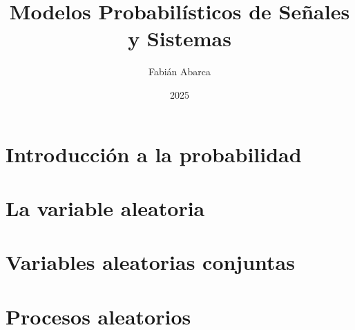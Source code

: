 \documentclass{memoir}
\title{Modelos Probabilísticos de Señales y Sistemas}
\author{Fabián Abarca}
\date{2025}
\begin{document}
\maketitle
\newpage
\tableofcontents

\part{Introducción a la probabilidad}





\part{La variable aleatoria}

\part{Variables aleatorias conjuntas}

\part{Procesos aleatorios}
\end{document}
